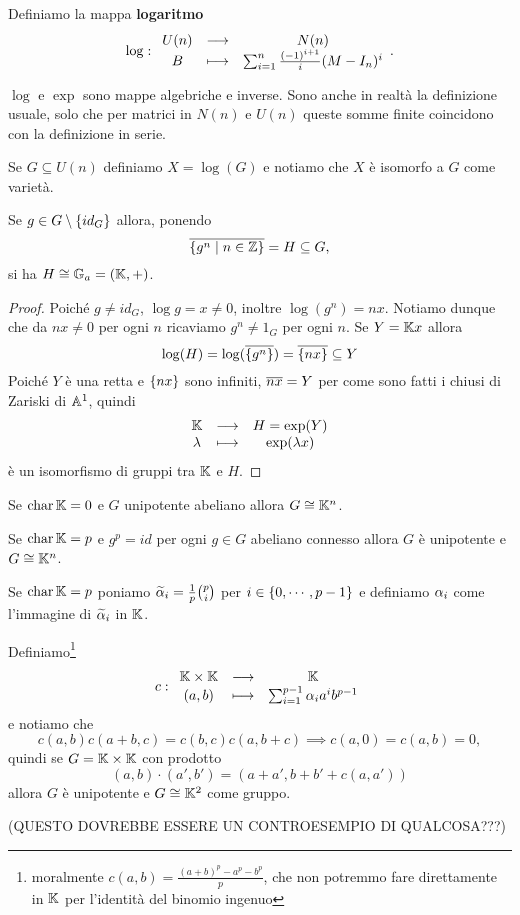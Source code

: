 \begin{definition}[Logaritmo]
Definiamo la mappa \textbf{logaritmo}
\[\log:\begin{array}{ccc} {U(n)} & \longrightarrow & {N(n)}\\ {B} & \longmapsto & {\sum_{i=1}^n\frac{(-1)^{i+1}}{i}(M-I_n)^i} \end{array}.\]
\end{definition}

\begin{remark}
$\log$ e $\exp$ sono mappe algebriche e inverse. Sono anche in realt\`a la definizione usuale, solo che per matrici in $N(n)$ e $U(n)$ queste somme finite coincidono con la definizione in serie.
\end{remark}

\begin{notation}
Se $G\subseteq U(n)$ definiamo $X=\log(G)$ e notiamo che $X$ \`e isomorfo a $G$ come variet\`a.
\end{notation}

\begin{proposition}\label{PrChiusuraDelGeneratoDaPotenzeDiElemento}
Se $g\in G\setminus\left\{{id_G}\right\}$ allora, ponendo
\[\overline{\left\{{g^n\mid n\in\mathbb{Z}}\right\}}=H\subseteq G,\]
si ha $H\cong \mathbb{G}_a=(\mathbb{K},+)$.
\end{proposition}
\begin{proof}
Poich\'e $g\neq id_G$, $\log g=x\neq 0$, inoltre $\log(g^n)=nx$. Notiamo dunque che da $nx\neq 0$ per ogni $n$ ricaviamo $g^n\neq 1_G$ per ogni $n$. Se $Y=\mathbb{K} x$ allora
\[\log(H)=\log(\overline{\left\{{g^n}\right\}})=\overline{\left\{{nx}\right\}}\subseteq Y\]
Poich\'e $Y$ \`e una retta e $\left\{{nx}\right\}$ sono infiniti, $\overline{nx}= Y$ per come sono fatti i chiusi di Zariski di $\mathbb{A}^1$, quindi 
\[\begin{array}{ccc} {\mathbb{K}} & \longrightarrow & {H=\exp(Y)}\\ {\lambda} & \longmapsto & {\exp(\lambda x)} \end{array}\]
\`e un isomorfismo di gruppi tra $\mathbb{K}$ e $H$.
\end{proof}

\begin{exercise}
Se $\operatorname{char} \mathbb{K}=0$ e $G$ unipotente abeliano allora $G\cong \mathbb{K}^n$.
\end{exercise}

\begin{fact}
Se $\operatorname{char} \mathbb{K}=p$ e $g^p=id$ per ogni $g\in G$ abeliano connesso allora $G$ \`e unipotente e $G\cong \mathbb{K}^n$.
\end{fact}

\begin{example}
Se $\operatorname{char} \mathbb{K}=p$ poniamo $\widetilde{\alpha}_i=\frac1p\binom pi$ per $i\in\left\{{0,\cdots, p-1}\right\}$ e definiamo $\alpha_i$ come l'immagine di $\widetilde{\alpha}_i$ in $\mathbb{K}$.

Definiamo\footnote{moralmente $c(a,b)=\frac{(a+b)^p-a^p-b^p}p$, che non potremmo fare direttamente in $\mathbb{K}$ per l'identit\`a del binomio ingenuo}
\[c:\begin{array}{ccc} {\mathbb{K}\times \mathbb{K}} & \longrightarrow & {\mathbb{K}}\\ {(a,b)} & \longmapsto & {\sum_{i=1}^{p-1} \alpha_i a^ib^{p-1}} \end{array}\]
e notiamo che
\[c(a,b)c(a+b,c)=c(b,c)c(a,b+c)\implies c(a,0)=c(a,b)=0,\]
quindi se $G=\mathbb{K}\times\mathbb{K}$ con prodotto
\[(a,b)\cdot(a',b')=(a+a',b+b'+c(a,a'))\]
allora $G$ \`e unipotente e $G\cong \mathbb{K}^2$ come gruppo.

(QUESTO DOVREBBE ESSERE UN CONTROESEMPIO DI QUALCOSA???)
\end{example}

